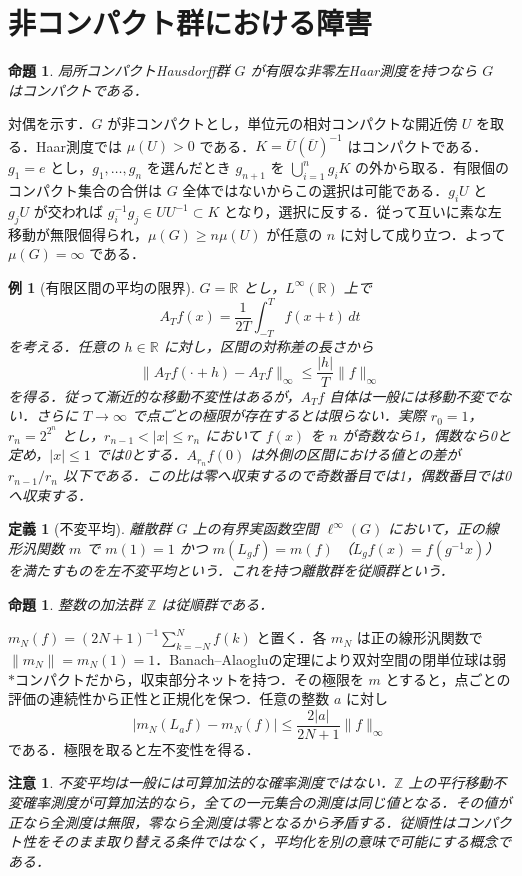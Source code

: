 \documentclass[a5paper,10pt,onecolumn]{jsarticle}
\makeatletter
\theoremstyle{mathnotetheorem}
\newtheorem{definition}[theorem]{定義}
\newtheorem{proposition}[theorem]{命題}
\newtheorem{example}[theorem]{例}
\newtheorem{remark}[theorem]{注意}
\renewcommand{\proofname}{証明}
\renewenvironment{proof}[1][\proofname]{%
  \par\pushQED{\qed}\normalfont\topsep4\p@\@plus2\p@\relax
  \trivlist\item[\hskip\labelsep\bfseries #1]\ignorespaces
}{\popQED\endtrivlist\@endpefalse}
\newcommand{\R}{\mathbb{R}}
\newcommand{\norm}[1]{\lVert #1\rVert}
\makeatother
\begin{document}
\section{非コンパクト群における障害}
\begin{proposition}\label{noncompact}
局所コンパクトHausdorff群 $G$ が有限な非零左Haar測度を持つなら $G$ はコンパクトである．
\end{proposition}
\begin{proof}
対偶を示す．$G$ が非コンパクトとし，単位元の相対コンパクトな開近傍 $U$ を取る．Haar測度では $\mu(U)>0$ である．$K=\overline U(\overline U)^{-1}$ はコンパクトである．$g_1=e$ とし，$g_1,\ldots,g_n$ を選んだとき $g_{n+1}$ を $\bigcup_{i=1}^n g_iK$ の外から取る．有限個のコンパクト集合の合併は $G$ 全体ではないからこの選択は可能である．$g_iU$ と $g_jU$ が交われば $g_i^{-1}g_j\in UU^{-1}\subset K$ となり，選択に反する．従って互いに素な左移動が無限個得られ，$\mu(G)\ge n\mu(U)$ が任意の $n$ に対して成り立つ．よって $\mu(G)=\infty$ である．
\end{proof}
\begin{example}[有限区間の平均の限界]
$G=\R$ とし，$L^\infty(\R)$ 上で
\[
 A_Tf(x)=\frac1{2T}\int_{-T}^T f(x+t)\,dt
\]
を考える．任意の $h\in\R$ に対し，区間の対称差の長さから
\[
 \norm{A_Tf(\cdot+h)-A_Tf}_\infty
 \le \frac{|h|}{T}\norm f_\infty
\]
を得る．従って漸近的な移動不変性はあるが，$A_Tf$ 自体は一般には移動不変でない．さらに $T\to\infty$ で点ごとの極限が存在するとは限らない．実際 $r_0=1$，$r_n=2^{2^n}$ とし，$r_{n-1}<|x|\le r_n$ において $f(x)$ を $n$ が奇数なら1，偶数なら0と定め，$|x|\le1$ では0とする．$A_{r_n}f(0)$ は外側の区間における値との差が $r_{n-1}/r_n$ 以下である．この比は零へ収束するので奇数番目では1，偶数番目では0へ収束する．
\end{example}
\begin{definition}[不変平均]
離散群 $G$ 上の有界実函数空間 $\ell^\infty(G)$ において，正の線形汎関数 $m$ で $m(1)=1$ かつ $m(L_gf)=m(f)$ （$L_gf(x)=f(g^{-1}x)$）を満たすものを左不変平均という．これを持つ離散群を従順群という．
\end{definition}
\begin{proposition}
整数の加法群 $\mathbb Z$ は従順群である．
\end{proposition}
\begin{proof}
$m_N(f)=(2N+1)^{-1}\sum_{k=-N}^N f(k)$ と置く．各 $m_N$ は正の線形汎関数で $\norm{m_N}=m_N(1)=1$．Banach--Alaogluの定理により双対空間の閉単位球は弱$*$コンパクトだから，収束部分ネットを持つ．その極限を $m$ とすると，点ごとの評価の連続性から正性と正規化を保つ．任意の整数 $a$ に対し
\[
 |m_N(L_af)-m_N(f)|\le\frac{2|a|}{2N+1}\norm f_\infty
\]
である．極限を取ると左不変性を得る．
\end{proof}
\begin{remark}
不変平均は一般には可算加法的な確率測度ではない．$\mathbb Z$ 上の平行移動不変確率測度が可算加法的なら，全ての一元集合の測度は同じ値となる．その値が正なら全測度は無限，零なら全測度は零となるから矛盾する．従順性はコンパクト性をそのまま取り替える条件ではなく，平均化を別の意味で可能にする概念である．
\end{remark}
\end{document}
